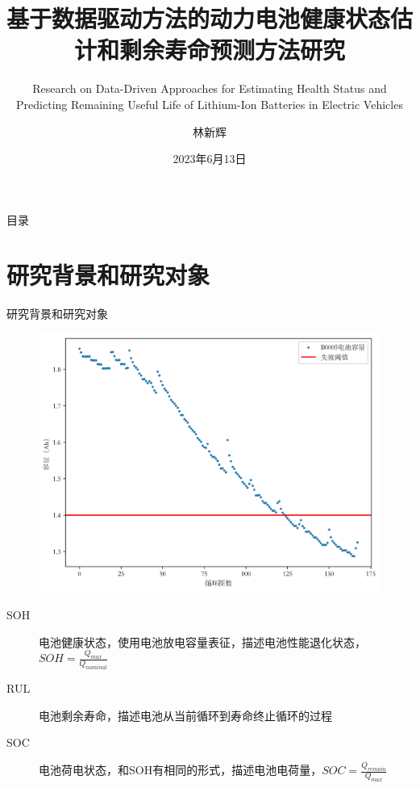 \documentclass{beamer}
\author{林新辉}
\title{基于数据驱动方法的动力电池健康状态估计和剩余寿命预测方法研究}
\subtitle{Research on Data-Driven Approaches for Estimating Health Status and Predicting Remaining Useful Life of Lithium-Ion Batteries in Electric Vehicles}
\institute{控制与计算机工程学院，华北电力大学}
\date{2023年6月13日}
\begin{document}
\kaishu
\begin{frame}
\titlepage
\end{frame}

\begin{frame}{\small 目录}
\tableofcontents[sectionstyle=show,subsectionstyle=show/shaded/hide,subsubsectionstyle=show/shaded/hide]
\end{frame}

\section{研究背景和研究对象}

\begin{frame}{\small 研究背景和研究对象}
	\begin{figure}[htbp]
		\includegraphics[scale=0.2]{figures/nasa_B0005_failure_threshold.jpg}
	\end{figure}
	\begin{description}
		\item[SOH]
		电池健康状态，使用电池放电容量表征，描述电池性能退化状态，$SOH = \frac{Q_{max}}{Q_{nominal}}$
		\item[RUL]
		电池剩余寿命，描述电池从当前循环到寿命终止循环的过程
		\item[SOC]
		电池荷电状态，和SOH有相同的形式，描述电池电荷量，$SOC = \frac{Q_{remain}}{Q_{max}}$
	\end{description}
\end{frame}
\end{document}
